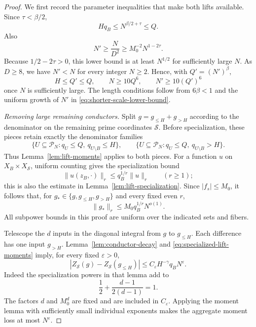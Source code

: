 \begin{proof}
We first record the parameter inequalities that make both lifts
available.  Since \(\tau<\beta/2\),
\[
 Hq_B\le N^{\beta/2+\tau}\le Q.
\]
Also
\begin{equation}
 N'\ge\frac{N}{D^2}\ge M_0^{-2}N^{1-2\tau}.
 \label{eq:shorter-scale-lower-bound}
\end{equation}
Because \(1/2-2\tau>0\), this lower bound is at least \(N^{1/2}\)
for sufficiently large \(N\).  As \(D\ge8\), we have \(N'<N\) for
every integer \(N\ge2\).  Hence, with \(Q'=(N')^\beta\),
\begin{equation}
 H\le Q'\le Q,\qquad
 N\ge10Q^6,\qquad N'\ge10(Q')^6
 \label{eq:scale-transfer-cutoffs}
\end{equation}
once \(N\) is sufficiently large.  The length conditions follow from
\(6\beta<1\) and the uniform growth of \(N'\) in
\eqref{eq:shorter-scale-lower-bound}.

\smallskip
\noindent\emph{Removing large remaining conductors.}
Split \(g=g_{\le H}+g_{>H}\) according to the denominator on the
remaining prime coordinates \(\mathcal S\).
Before specialization, these pieces retain exactly the denominator
families
\[
 \{U\subseteq\mathcal P_N:q_U\le Q,\ q_{U\setminus B}\le H\},
 \qquad
 \{U\subseteq\mathcal P_N:q_U\le Q,\ q_{U\setminus B}>H\}.
\]
Thus Lemma~\ref{lem:lift-moments} applies to both pieces.
For a function \(u\) on \(X_B\times X_{\mathcal S}\), uniform counting
gives the specialization bound
\[
 \|u(z_B,\cdot)\|_r
 \le q_B^{1/r}\|u\|_r
 \qquad(r\ge1);
\]
this is also the estimate in Lemma~\ref{lem:lift-specialization}.
Since \(|f_s|\le M_0\), it follows that, for
\(g_*\in\{g,g_{\le H},g_{>H}\}\) and every fixed even \(r\),
\begin{equation}
 \|g_*\|_r\le M_0q_B^{1/r}N^{o(1)}.
 \label{eq:specialized-lift-moments}
\end{equation}
All subpower bounds in this proof are uniform over the indicated
sets and fibers.

Telescope the \(d\) inputs in the diagonal integral from \(g\) to
\(g_{\le H}\).  Each difference has one input \(g_{>H}\).
Lemma~\ref{lem:conductor-decay} and
\eqref{eq:specialized-lift-moments} imply, for every fixed
\(\varepsilon>0\),
\begin{equation}
 |Z_{\mathcal S}(g)-Z_{\mathcal S}(g_{\le H})|
 \le C_\varepsilon H^{-\gamma}q_BN^\varepsilon.
 \label{eq:scale-transfer-first-error}
\end{equation}
Indeed the specialization powers in that lemma add to
\[
 \frac12+\frac{d-1}{2(d-1)}=1.
\]
The factors \(d\) and \(M_0^d\) are fixed and are included in
\(C_\varepsilon\).  Applying the moment lemma with sufficiently small
individual exponents makes the aggregate moment loss at most
\(N^\varepsilon\).


\end{proof}
